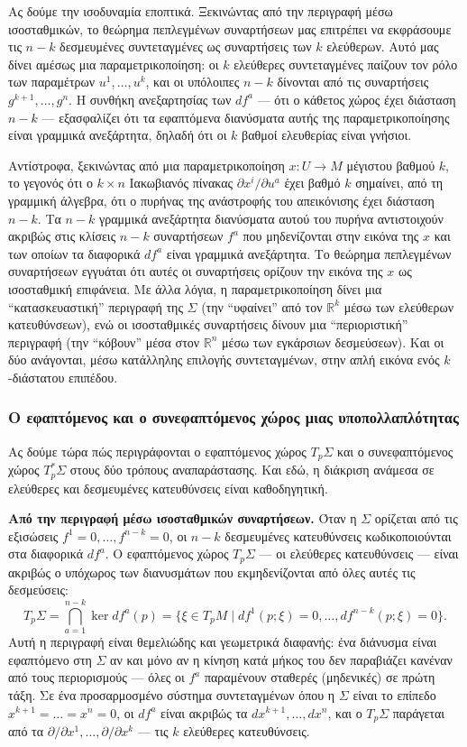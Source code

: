 \documentclass[12pt]{article}
\begin{document}
Ας δούμε την ισοδυναμία εποπτικά. Ξεκινώντας από την περιγραφή μέσω ισοσταθμικών, το θεώρημα πεπλεγμένων συναρτήσεων μας επιτρέπει να εκφράσουμε τις $n-k$ δεσμευμένες συντεταγμένες ως συναρτήσεις των $k$ ελεύθερων. Αυτό μας δίνει αμέσως μια παραμετρικοποίηση: οι $k$ ελεύθερες συντεταγμένες παίζουν τον ρόλο των παραμέτρων $u^1, \dots, u^k$, και οι υπόλοιπες $n-k$ δίνονται από τις συναρτήσεις $g^{k+1}, \dots, g^n$. Η συνθήκη ανεξαρτησίας των $df^a$ --- ότι ο κάθετος χώρος έχει διάσταση $n-k$ --- εξασφαλίζει ότι τα εφαπτόμενα διανύσματα αυτής της παραμετρικοποίησης είναι γραμμικά ανεξάρτητα, δηλαδή ότι οι $k$ βαθμοί ελευθερίας είναι γνήσιοι.

Αντίστροφα, ξεκινώντας από μια παραμετρικοποίηση $x: U \to M$ μέγιστου βαθμού $k$, το γεγονός ότι ο $k \times n$ Ιακωβιανός πίνακας $\partial x^i / \partial u^a$ έχει βαθμό $k$ σημαίνει, από τη γραμμική άλγεβρα, ότι ο πυρήνας της ανάστροφής του απεικόνισης έχει διάσταση $n-k$. Τα $n-k$ γραμμικά ανεξάρτητα διανύσματα αυτού του πυρήνα αντιστοιχούν ακριβώς στις κλίσεις $n-k$ συναρτήσεων $f^a$ που μηδενίζονται στην εικόνα της $x$ και των οποίων τα διαφορικά $df^a$ είναι γραμμικά ανεξάρτητα. Το θεώρημα πεπλεγμένων συναρτήσεων εγγυάται ότι αυτές οι συναρτήσεις ορίζουν την εικόνα της $x$ ως ισοσταθμική επιφάνεια. Με άλλα λόγια, η παραμετρικοποίηση δίνει μια ``κατασκευαστική'' περιγραφή της $\Sigma$ (την ``υφαίνει'' από τον $\mathbb{R}^k$ μέσω των ελεύθερων κατευθύνσεων), ενώ οι ισοσταθμικές συναρτήσεις δίνουν μια ``περιοριστική'' περιγραφή (την ``κόβουν'' μέσα στον $\mathbb{R}^n$ μέσω των εγκάρσιων δεσμεύσεων). Και οι δύο ανάγονται, μέσω κατάλληλης επιλογής συντεταγμένων, στην απλή εικόνα ενός $k$-διάστατου επιπέδου.

\subsubsection{Ο εφαπτόμενος και ο συνεφαπτόμενος χώρος μιας υποπολλαπλότητας}

Ας δούμε τώρα πώς περιγράφονται ο εφαπτόμενος χώρος $T_p\Sigma$ και ο συνεφαπτόμενος χώρος $T_p^*\Sigma$ στους δύο τρόπους αναπαράστασης. Και εδώ, η διάκριση ανάμεσα σε ελεύθερες και δεσμευμένες κατευθύνσεις είναι καθοδηγητική.

\textbf{Από την περιγραφή μέσω ισοσταθμικών συναρτήσεων.} Όταν η $\Sigma$ ορίζεται από τις εξισώσεις $f^1 = 0, \dots, f^{n-k} = 0$, οι $n-k$ δεσμευμένες κατευθύνσεις κωδικοποιούνται στα διαφορικά $df^a$. Ο εφαπτόμενος χώρος $T_p\Sigma$ --- οι ελεύθερες κατευθύνσεις --- είναι ακριβώς ο υπόχωρος των διανυσμάτων που εκμηδενίζονται από όλες αυτές τις δεσμεύσεις:
\[
T_p\Sigma = \bigcap_{a=1}^{n-k} \ker df^a(p) = \{ \xi \in T_pM \mid df^1(p; \xi) = 0, \dots, df^{n-k}(p; \xi) = 0 \}. \tag{0.12}
\]
Αυτή η περιγραφή είναι θεμελιώδης και γεωμετρικά διαφανής: ένα διάνυσμα είναι εφαπτόμενο στη $\Sigma$ αν και μόνο αν η κίνηση κατά μήκος του δεν παραβιάζει κανέναν από τους περιορισμούς --- όλες οι $f^a$ παραμένουν σταθερές (μηδενικές) σε πρώτη τάξη. Σε ένα προσαρμοσμένο σύστημα συντεταγμένων όπου η $\Sigma$ είναι το επίπεδο $x^{k+1} = \dots = x^n = 0$, οι $df^a$ είναι ακριβώς τα $dx^{k+1}, \dots, dx^n$, και ο $T_p\Sigma$ παράγεται από τα $\partial / \partial x^1, \dots, \partial / \partial x^k$ --- τις $k$ ελεύθερες κατευθύνσεις.
\end{document}
